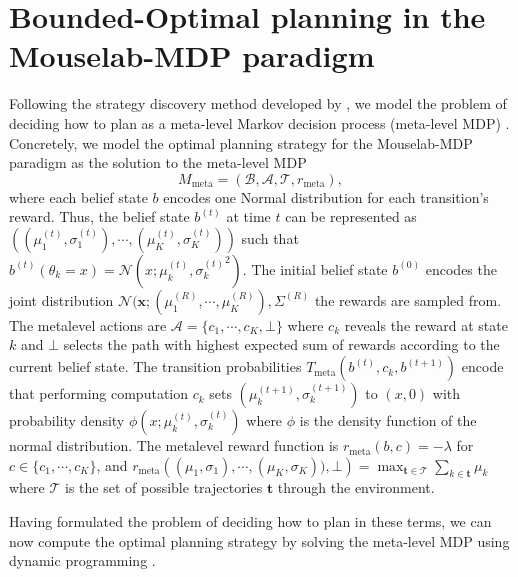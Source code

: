 \newcommand{\A}{\mathcal{A}}
\newcommand{\B}{\mathcal{B}}
\newcommand{\T}{\mathcal{T}}
\newcommand{\meta}{_{\text{meta}}}
\newcommand{\Qmeta}{$Q\meta ^\star$}
\newcommand{\expect}[1]{\mathds{E} \left[ #1 \right]}

\section{Bounded-Optimal planning in the Mouselab-MDP paradigm}
\label{sec:mouselab_mdp}


Following the strategy discovery method developed by \cite{LiederCallawayGulKruegerGriffiths2017}, we model the problem of deciding how to plan as a meta-level Markov decision process (meta-level MDP) \cite{Hay2012}.
Concretely, we model the optimal planning strategy for the Mouselab-MDP paradigm as the solution to the meta-level MDP
\begin{equation}
    M\meta = (\B, \A, \T, r\meta),\label{eq:MouselabMDPMetaMDP}
\end{equation}
where each belief state $b$ encodes one Normal distribution for each transition's reward. Thus, the belief state $b^{(t)}$ at time $t$ can be represented as $((\mu_1^{(t)},\sigma_1^{(t)}), \cdots, (\mu_K^{(t)},\sigma_K^{(t)}))$ such that $b^{(t)}(\theta_k=x)=\mathcal{N}(x; \mu_k^{(t)}, {\sigma_k^{(t)}}^2)$.
The initial belief state $b^{(0)}$ encodes the joint distribution $\mathcal{N}(\mathbf{x}; (\mu^{(R)}_1,\cdots,\mu^{(R)}_K), \Sigma^{(R)}$ the rewards are sampled from. 
The metalevel actions are $\A = \{c_1, \cdots, c_K, \bot\}$ where $c_k$ reveals the reward at state $k$ and $\bot$ selects the path with highest expected sum of rewards according to the current belief state.
The transition probabilities $T\meta(b^{(t)}, c_k, b^{(t+1)})$ encode that performing computation $c_k$ sets $(\mu_k^{(t+1)}, \sigma_k^{(t+1)})$ to $(x,0)$ with probability density $\phi(x;\mu_k^{(t)},\sigma_k^{(t)})$ where $\phi$ is the density function of the normal distribution.
The metalevel reward function is $r\meta(b, c) = -\lambda$ for $c \in \{c_1,\cdots, c_K \}$, and $r\meta\left( (\mu_1,\sigma_1),\cdots, (\mu_K,\sigma_K)), \bot\right) = \max_{\mathbf{t}\in \mathcal{T}} \sum_{k \in \mathbf{t}} \mu_k$ where $\mathcal{T}$ is the set of possible trajectories $\mathbf{t}$ through the environment.



Having formulated the problem of deciding how to plan in these terms, we can now compute the optimal planning strategy by solving the meta-level MDP using dynamic programming \cite{Puterman2014}.
